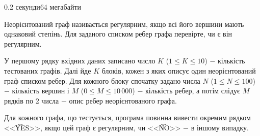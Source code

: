 \begin{problem}{}{}{}{0.2 секунди}{64 мегабайти}

Неорієнтований граф називається регулярним, якщо всі його вершини мають однаковий степінь. 
Для заданого списком ребер графа перевірте, чи є він регулярним.

\InputFile
У першому рядку вхідних даних записано число $K$ ($1 \le K \le 10$) $-$ кількість тестованих графів. 
Далі йде $K$ блоків, кожен з яких описує один неорієнтований граф списком ребер. 
Для кожного блоку спочатку задано числа $N$ ($1 \le N \le 100$) $-$ кількість вершин і $M$ ($0 \le M \le 10\,000$) $-$
кількість ребер, а потім слідує $M$ рядків по $2$ числа $-$ опис ребер неорієнтованого графа.

\OutputFile
Для кожного графа, що тестується, програма повинна вивести окремим рядком <<{\t{YES}}>>, якщо цей граф
є регулярним, чи <<{\t{NO}}>> $-$ в іншому випадку.

\Example

\begin{example}
%
\end{example}

\end{problem}

